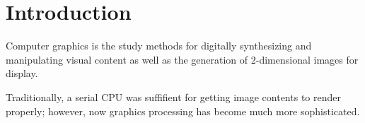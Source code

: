 \chapter{Introduction}

Computer graphics is the study methods for digitally
synthesizing and manipulating visual content as well as the
generation of 2-dimensional images for display.

Traditionally, a serial CPU was suffifient for getting image
contents to render properly; however,
now graphics processing has become much more sophisticated.
